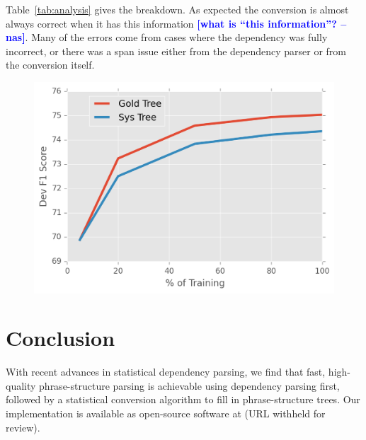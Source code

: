 \documentclass[11pt,letterpaper]{article}
\newcommand{\nascomment}[1]{\textcolor{blue}{\bf \small [#1 --nas]}}
\begin{document}
Table~\ref{tab:analysis} gives the breakdown. As expected the conversion 
is almost always correct when it has this information \nascomment{what
  is ``this information''?}. Many of 
the errors come from cases where the dependency was fully 
incorrect, or there was a span issue either from the dependency 
parser or from the conversion itself.





\begin{figure}
  \centering
  \includegraphics[scale=0.4]{../notebooks/data}
\label{fig:dataamo}
\end{figure}




\section{Conclusion}

With recent advances in statistical dependency parsing, we find that
fast, high-quality phrase-structure parsing is achievable using dependency
parsing first, followed by a statistical conversion algorithm to
fill in phrase-structure trees. 
Our implementation is available as open-source software at (URL
withheld for review).
\end{document}
